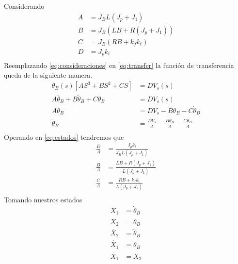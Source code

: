 \documentclass[a4paper]{IEEEtran} %
\begin{document}
Considerando
\begin{equation}
    \begin{split}
        A&=J_{B}L(J_{p}+J_{1})\\
        B&=J_{B}(LB+R(J_{p}+J_{1}))\\
        C&=J_{B}(RB+k_{f}k_{t})\\
        D&=J_{p}k_{t}\\
    \end{split}
    \label{eq:consideraciones}
\end{equation}
Reemplazando \ref{eq:consideraciones} en \ref{eq:transfer} la función de transferencia queda de la siguiente manera.
\begin{equation}
    \begin{split}
        \theta_{B}(s)[AS^3+BS^2+CS]&=DV_{s}(s)\\
        A\dddot{\theta}_{B}+B\ddot{\theta}_{B}+C\dot{\theta}_{B}&=DV_{s}(s)\\
        A\dddot{\theta}_{B}&=DV_{s}-B\ddot{\theta}_{B}-C\dot{\theta}_{B}\\
        \dddot{\theta}_{B}&=\frac{DV_{s}}{A}-\frac{B\ddot{\theta}_{B}}{A}-\frac{C\dot{\theta}_{B}}{A}\\
    \end{split}
    \label{eq:estados}
\end{equation}
Operando en \ref{eq:estados} tendremos que 
\begin{equation}
    \begin{split}
        \frac{D}{A}&=\frac{J_{p}k_{t}}{J_{B}L(J_{p}+J_{1})}\\
        \frac{B}{A}&=\frac{LB+R(J_{p}+J_{1})}{L(J_{p}+J_{1})}\\
        \frac{C}{A}&=\frac{RB+k_{f}k_{t}}{L(J_{p}+J_{1})}\\
    \end{split}
    \label{eq:states}
\end{equation}
Tomando nuestros estados
\begin{equation}
    \begin{split}
        X_{1}&=\dot{\theta}_{B}\\
        X_{2}&=\ddot{\theta}_{B}\\
        \dot{X_{2}}&=\dddot{\theta}_{B}\\
        \dot{X_{1}}&=\ddot{\theta}_{B}\\
        \dot{X_{1}}&=X_{2}\\
    \end{split}
    \label{eq:finalstates}
\end{equation}
\end{document}
